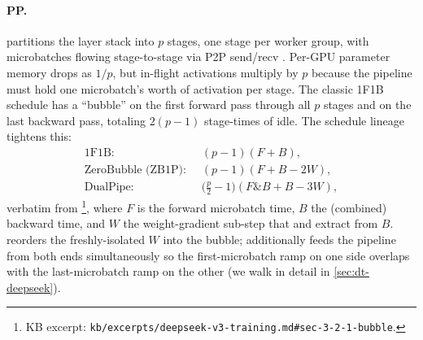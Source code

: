 \paragraph{PP.}  partitions the layer stack into $p$ stages, one
stage per worker group, with microbatches flowing stage-to-stage via
P2P send/recv \citep[\S 2.1.4]{torchtitan2024}. Per-GPU parameter
memory drops as $1/p$, but in-flight activations multiply by $p$
because the pipeline must hold one microbatch's worth of activation per
stage. The classic 1F1B schedule \citep[after][]{harlap2018-pipedream}
has a ``bubble'' on the first forward pass through all $p$ stages and
on the last backward pass, totaling $2(p-1)$ stage-times of idle. The
schedule lineage tightens this:
\begin{align}
\text{1F1B:}\;\;& (p-1)(F + B), \nonumber\\
\text{ZeroBubble (ZB1P):}\;\;& (p-1)(F + B - 2W), \nonumber\\
\text{DualPipe:}\;\;& \bigl(\tfrac{p}{2} - 1\bigr)(F\mathbin{\text{\&}}B + B - 3W),
\label{eq:bubble-formulas}
\end{align}
verbatim from \citet[\S 3.2.1, table]{deepseek-v3}\footnote{KB excerpt:
\nolinkurl{kb/excerpts/deepseek-v3-training.md#sec-3-2-1-bubble}.}, where
$F$ is the forward microbatch time, $B$ the (combined) backward time,
and $W$ the weight-gradient sub-step that  and 
extract from $B$.  reorders the freshly-isolated $W$ into
the bubble;  additionally feeds the pipeline from both ends
simultaneously so the first-microbatch ramp on one side overlaps with
the last-microbatch ramp on the other (we walk  in detail in
\cref{sec:dt-deepseek}). 

